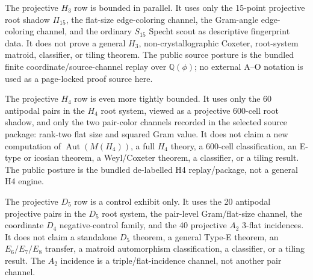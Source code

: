 The projective \(H_3\) row is bounded in parallel.  It uses only the 15-point projective root shadow \(\Pi_{15}\), the flat-size edge-coloring channel, the Gram-angle edge-coloring channel, and the ordinary \(S_{15}\) Specht scout as descriptive fingerprint data.  It does not prove a general \(H_3\), non-crystallographic Coxeter, root-system matroid, classifier, or tiling theorem.  The public source posture is the bundled finite coordinate/source-channel replay over \(\mathbb Q(\phi)\); no external A--O notation is used as a page-locked proof source here.


The projective \(H_4\) row is even more tightly bounded.  It uses only the 60 antipodal pairs in the \(H_4\) root system, viewed as a projective 600-cell root shadow, and only the two pair-color channels recorded in the selected source package: rank-two flat size and squared Gram value.  It does not claim a new computation of \(\operatorname{Aut}(M(H_4))\), a full \(H_4\) theory, a 600-cell classification, an E-type or icosian theorem, a Weyl/Coxeter theorem, a classifier, or a tiling result.  The public posture is the bundled de-labelled H4 replay/package, not a general H4 engine.


The projective \(D_5\) row is a control exhibit only.  It uses the 20 antipodal projective pairs in the \(D_5\) root system, the pair-level Gram/flat-size channel, the coordinate \(D_4\) negative-control family, and the 40 projective \(A_2\) 3-flat incidences.  It does not claim a standalone \(D_5\) theorem, a general Type-E theorem, an \(E_6/E_7/E_8\) transfer, a matroid automorphism classification, a classifier, or a tiling result.  The \(A_2\) incidence is a triple/flat-incidence channel, not another pair channel.

